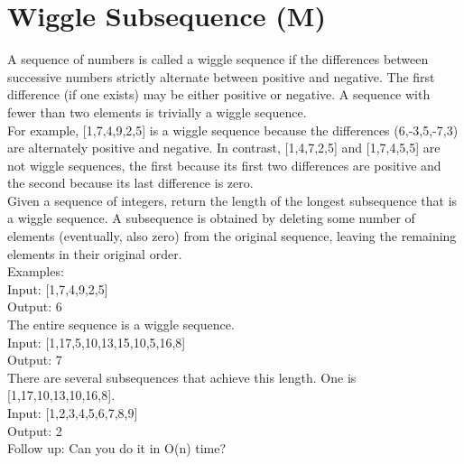 \section{Wiggle Subsequence (M)}
A sequence of numbers is called a wiggle sequence if the differences between successive numbers strictly alternate between positive and negative. The first difference (if one exists) may be either positive or negative. A sequence with fewer than two elements is trivially a wiggle sequence.\\

For example, [1,7,4,9,2,5] is a wiggle sequence because the differences (6,-3,5,-7,3) are alternately positive and negative. In contrast, [1,4,7,2,5] and [1,7,4,5,5] are not wiggle sequences, the first because its first two differences are positive and the second because its last difference is zero.\\

Given a sequence of integers, return the length of the longest subsequence that is a wiggle sequence. A subsequence is obtained by deleting some number of elements (eventually, also zero) from the original sequence, leaving the remaining elements in their original order.\\

Examples:\\

Input: [1,7,4,9,2,5]\\
Output: 6\\
The entire sequence is a wiggle sequence.\\

Input: [1,17,5,10,13,15,10,5,16,8]\\
Output: 7\\
There are several subsequences that achieve this length. One is [1,17,10,13,10,16,8].\\

Input: [1,2,3,4,5,6,7,8,9]\\
Output: 2\\

Follow up: Can you do it in O(n) time? \\


